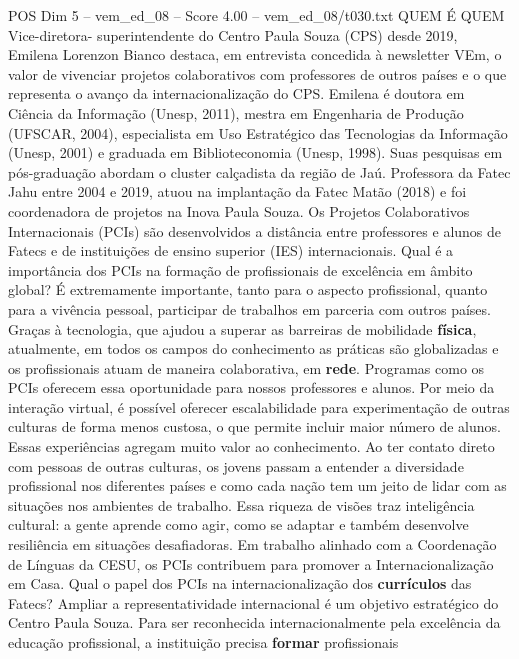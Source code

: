 \begin{textsample}{POS Dim 5 – vem\_ed\_08 – Score 4.00 – vem\_ed\_08/t030.txt}  \label{ex:f5_pos_146}
QUEM É QUEM Vice-diretora- superintendente do Centro Paula Souza (CPS) desde 2019, Emilena Lorenzon Bianco destaca, em entrevista concedida à newsletter VEm, o valor de vivenciar projetos colaborativos com professores de outros países e o que representa o avanço da internacionalização do CPS.
Emilena é doutora em Ciência da Informação (Unesp, 2011), mestra em Engenharia de Produção (UFSCAR, 2004), especialista em Uso Estratégico das Tecnologias da Informação (Unesp, 2001) e graduada em Biblioteconomia (Unesp, 1998).
Suas pesquisas em pós-graduação abordam o cluster calçadista da região de Jaú.
Professora da Fatec Jahu entre 2004 e 2019, atuou na implantação da Fatec Matão (2018) e foi coordenadora de projetos na Inova Paula Souza.
Os Projetos Colaborativos Internacionais (PCIs) são desenvolvidos a distância entre professores e alunos de Fatecs e de instituições de ensino superior (IES) internacionais.
Qual é a importância dos PCIs na formação de profissionais de excelência em âmbito global?
É extremamente importante, tanto para o aspecto profissional, quanto para a vivência pessoal, participar de trabalhos em parceria com outros países.
Graças à tecnologia, que ajudou a superar as barreiras de mobilidade \textbf{física}, atualmente, em todos os campos do conhecimento as práticas são globalizadas e os profissionais atuam de maneira colaborativa, em \textbf{rede}.
Programas como os PCIs oferecem essa oportunidade para nossos professores e alunos.
Por meio da interação virtual, é possível oferecer escalabilidade para experimentação de outras culturas de forma menos custosa, o que permite incluir maior número de alunos.
Essas experiências agregam muito valor ao conhecimento.
Ao ter contato direto com pessoas de outras culturas, os jovens passam a entender a diversidade profissional nos diferentes países e como cada nação tem um jeito de lidar com as situações nos ambientes de trabalho.
Essa riqueza de visões traz inteligência cultural: a gente aprende como agir, como se adaptar e também desenvolve resiliência em situações desafiadoras.
Em trabalho alinhado com a Coordenação de Línguas da CESU, os PCIs contribuem para promover a Internacionalização em Casa.
Qual o papel dos PCIs na internacionalização dos \textbf{currículos} das Fatecs?
Ampliar a representatividade internacional é um objetivo estratégico do Centro Paula Souza.
Para ser reconhecida internacionalmente pela excelência da educação profissional, a instituição precisa \textbf{formar} profissionais

\end{textsample}
